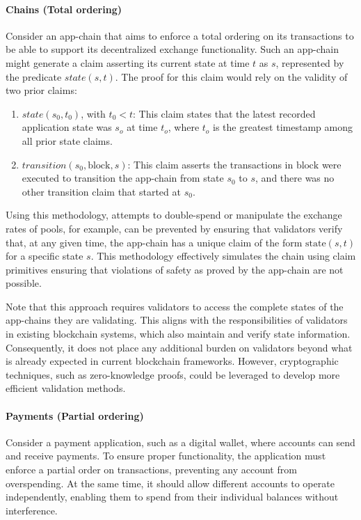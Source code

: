 \documentclass{article}
\begin{document}
\paragraph{Chains (Total ordering)\\}
Consider an app-chain that aims to enforce a total ordering on its transactions to be able to support its decentralized exchange functionality. Such an app-chain might generate a claim asserting its current state at time $t$ as $s$, represented by the predicate $\textit{state}(s, t)$. The proof for this claim would rely on the validity of two prior claims:

\begin{enumerate}
    \item $\textit{state}(s_0, t_0)$, with $t_0 < t$: This claim states that the latest recorded application state was $s_o$ at time $t_o$, where $t_o$ is the greatest timestamp among all prior state claims.
    \item $\textit{transition}(s_0, \text{block}, s)$: This claim asserts the transactions in $\text{block}$ were executed to transition the app-chain from state $s_0$ to $s$, and there was no other transition claim that started at $s_0$.
\end{enumerate}

Using this methodology, attempts to double-spend or manipulate the exchange rates of pools, for example, can be prevented by ensuring that validators verify that, at any given time, the app-chain has a unique claim of the form $\text{state}(s, t)$ for a specific state $s$. This methodology effectively simulates the chain using claim primitives ensuring that violations of safety as proved by the app-chain are not possible. 

Note that this approach requires validators to access the complete states of the app-chains they are validating. This aligns with the responsibilities of validators in existing blockchain systems, which also maintain and verify state information. Consequently, it does not place any additional burden on validators beyond what is already expected in current blockchain frameworks. However, cryptographic techniques, such as zero-knowledge proofs, could be leveraged to develop more efficient validation methods.

\paragraph{Payments (Partial ordering)\\}
Consider a payment application, such as a digital wallet, where accounts can send and receive payments. To ensure proper functionality, the application must enforce a partial order on transactions, preventing any account from overspending. At the same time, it should allow different accounts to operate independently, enabling them to spend from their individual balances without interference.
\end{document}
